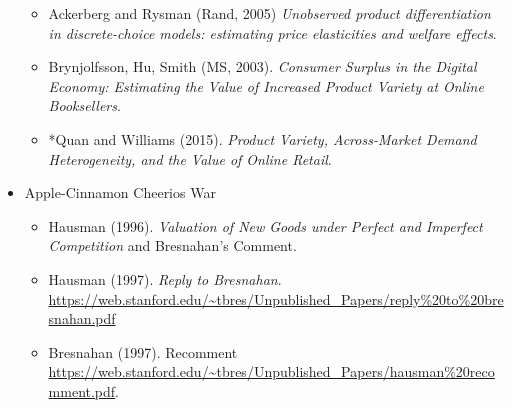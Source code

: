 \documentclass[11pt]{article}
\begin{document}
\begin{itemize}
\begin{itemize}
\item Ackerberg and Rysman (Rand, 2005) \textit{Unobserved product differentiation in discrete-choice models: estimating price elasticities and welfare effects}.
\item Brynjolfsson, Hu, Smith (MS, 2003). \textit{Consumer Surplus in the Digital Economy: Estimating the Value of Increased Product Variety at Online Booksellers}.
\item *Quan and Williams (2015). \textit{Product Variety, Across-Market Demand Heterogeneity, and the Value of Online Retail}.
\end{itemize}
\item Apple-Cinnamon Cheerios War
\begin{itemize}
\item Hausman (1996). \textit{Valuation of New Goods under Perfect and Imperfect Competition} and Bresnahan's Comment.
\item Hausman (1997). \textit{Reply to Bresnahan}. \url{https://web.stanford.edu/~tbres/Unpublished_Papers/reply%20to%20bresnahan.pdf}
\item Bresnahan (1997). Recomment \url{https://web.stanford.edu/~tbres/Unpublished_Papers/hausman%20recomment.pdf}.
\end{itemize}
\end{itemize}
\end{document}
